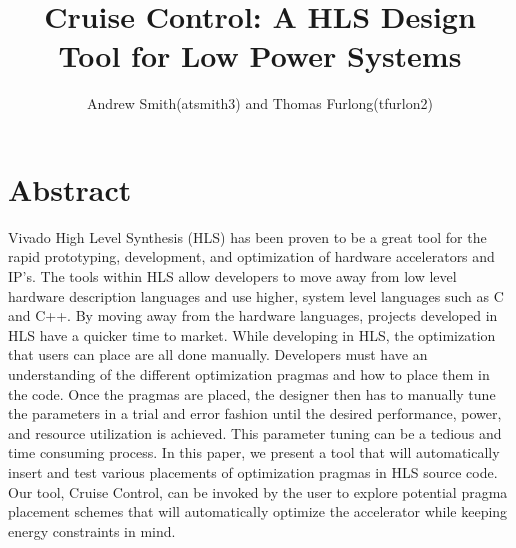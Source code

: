 \documentclass[letterpaper, 10 pt, conference]{IEEEconf}  %
\title{\LARGE \bf Cruise Control: A HLS Design Tool for Low Power Systems}
\author{Andrew Smith(atsmith3) and Thomas Furlong(tfurlon2)}%
\begin{document}
\maketitle
\thispagestyle{empty}
\pagestyle{empty}


\section{Abstract}
Vivado High Level Synthesis (HLS) has been proven to be a great tool for the rapid prototyping, development, and optimization of hardware accelerators and IP's. The tools within HLS allow developers to move away from low level hardware description languages and use higher, system level languages such as C and C++. By moving away from the hardware languages, projects developed in HLS have a quicker time to market. While developing in HLS, the optimization that users can place are all done manually. Developers must have an understanding of the different optimization pragmas and how to place them in the code. Once the pragmas are placed, the designer then has to manually tune the parameters in a trial and error fashion until the desired performance, power, and resource utilization is achieved. This parameter tuning can be a tedious and time consuming process. In this paper, we present a tool that will automatically insert and test various placements of optimization pragmas in HLS source code. Our tool, Cruise Control, can be invoked by the user to explore potential pragma placement schemes that will automatically optimize the accelerator while keeping energy constraints in mind.
	
\end{document}

